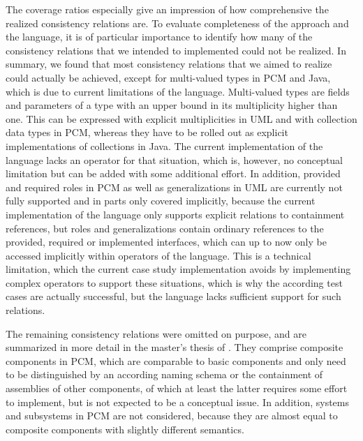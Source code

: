 The coverage ratios especially give an impression of how comprehensive the realized consistency relations are.
To evaluate completeness of the \commonalities approach and the language, it is of particular importance to identify how many of the consistency relations that we intended to implemented could not be realized.
In summary, we found that most consistency relations that we aimed to realize could actually be achieved, except for multi-valued types in \gls{PCM} and Java, which is due to current limitations of the language.
Multi-valued types are fields and parameters of a type with an upper bound in its multiplicity higher than one.
This can be expressed with explicit multiplicities in \gls{UML} and with collection data types in \gls{PCM}, whereas they have to be rolled out as explicit implementations of collections in Java.
The current implementation of the \commonalities language lacks an operator for that situation, which is, however, no conceptual limitation but can be added with some additional effort.
In addition, provided and required roles in \gls{PCM} as well as generalizations in \gls{UML} are currently not fully supported and in parts only covered implicitly, because the current implementation of the \commonalities language only supports explicit relations to containment references, but roles and generalizations contain ordinary references to the provided, required or implemented interfaces, which can up to now only be accessed implicitly within operators of the \commonalities language.
This is a technical limitation, which the current case study implementation avoids by implementing complex operators to support these situations, which is why the according test cases are actually successful, but the language lacks sufficient support for such relations.

The remaining consistency relations were omitted on purpose, and are summarized in more detail in the master's thesis of \textcite[Sec. 3]{hennig2020ma}.
They comprise composite components in \gls{PCM}, which are comparable to basic components and only need to be distinguished by an according naming schema or the containment of assemblies of other components, of which at least the latter requires some effort to implement, but is not expected to be a conceptual issue.
In addition, systems and subsystems in \gls{PCM} are not considered, because they are almost equal to composite components with slightly different semantics.

